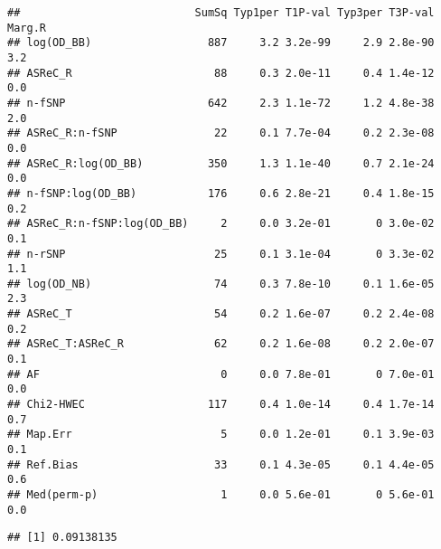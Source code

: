 \documentclass[]{article}
\newenvironment{Shaded}{\begin{snugshade}}{\end{snugshade}}
\newcommand{\KeywordTok}[1]{\textcolor[rgb]{0.13,0.29,0.53}{\textbf{#1}}}
\newcommand{\DataTypeTok}[1]{\textcolor[rgb]{0.13,0.29,0.53}{#1}}
\newcommand{\StringTok}[1]{\textcolor[rgb]{0.31,0.60,0.02}{#1}}
\newcommand{\OperatorTok}[1]{\textcolor[rgb]{0.81,0.36,0.00}{\textbf{#1}}}
\newcommand{\NormalTok}[1]{#1}
\begin{document}
\begin{Shaded}
\end{Shaded}

\begin{verbatim}
##                           SumSq Typ1per T1P-val Typ3per T3P-val Marg.R
## log(OD_BB)                  887     3.2 3.2e-99     2.9 2.8e-90    3.2
## ASReC_R                      88     0.3 2.0e-11     0.4 1.4e-12    0.0
## n-fSNP                      642     2.3 1.1e-72     1.2 4.8e-38    2.0
## ASReC_R:n-fSNP               22     0.1 7.7e-04     0.2 2.3e-08    0.0
## ASReC_R:log(OD_BB)          350     1.3 1.1e-40     0.7 2.1e-24    0.0
## n-fSNP:log(OD_BB)           176     0.6 2.8e-21     0.4 1.8e-15    0.2
## ASReC_R:n-fSNP:log(OD_BB)     2     0.0 3.2e-01       0 3.0e-02    0.1
## n-rSNP                       25     0.1 3.1e-04       0 3.3e-02    1.1
## log(OD_NB)                   74     0.3 7.8e-10     0.1 1.6e-05    2.3
## ASReC_T                      54     0.2 1.6e-07     0.2 2.4e-08    0.2
## ASReC_T:ASReC_R              62     0.2 1.6e-08     0.2 2.0e-07    0.1
## AF                            0     0.0 7.8e-01       0 7.0e-01    0.0
## Chi2-HWEC                   117     0.4 1.0e-14     0.4 1.7e-14    0.7
## Map.Err                       5     0.0 1.2e-01     0.1 3.9e-03    0.1
## Ref.Bias                     33     0.1 4.3e-05     0.1 4.4e-05    0.6
## Med(perm-p)                   1     0.0 5.6e-01       0 5.6e-01    0.0
\end{verbatim}

\begin{Shaded}
\end{Shaded}

\begin{verbatim}
## [1] 0.09138135
\end{verbatim}

\begin{Shaded}
\end{Shaded}
\end{document}
